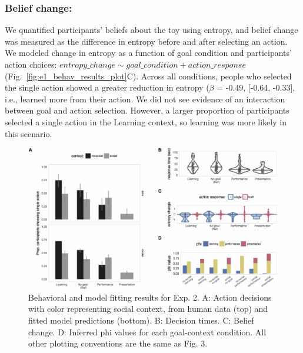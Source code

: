 \documentclass[10pt, letterpaper]{article}
\newenvironment{CodeChunk}{}{}
\begin{document}
\subsubsection{Belief change:}\label{belief-change}

We quantified participants' beliefs about the toy using entropy, and
belief change was measured as the difference in entropy before and after
selecting an action. We modeled change in entropy as a function of goal
condition and participants' action choices:
\texttt{$entropy\_change \sim goal\_condition + action\_response$}
(Fig.~\ref{fig:e1_behav_results_plot}C). Across all conditions, people
who selected the single action showed a greater reduction in entropy
(\(\beta\) = -0.49, {[}-0.64, -0.33{]}, i.e., learned more from their
action. We did not see evidence of an interaction between goal and
action selection. However, a larger proportion of participants selected
a single action in the Learning context, so learning was more likely in
this scenario.

\begin{CodeChunk}
\begin{figure}[tb]

{\centering \includegraphics[width=0.95\linewidth]{figs/e2_results-1} 

}

\caption[Behavioral and model fitting results for Exp]{Behavioral and model fitting results for Exp. 2. A: Action decisions with color representing social context, from human data (top) and fitted model predictions (bottom). B: Decision times. C: Belief change. D: Inferred phi values for each goal-context condition. All other plotting conventions are the same as Fig. 3.}\label{fig:e2_results}
\end{figure}
\end{CodeChunk}
\end{document}
